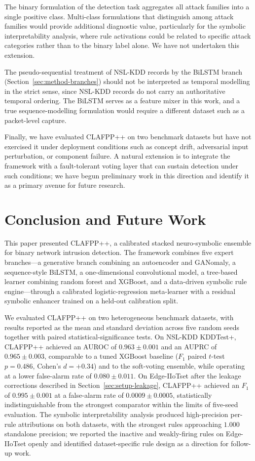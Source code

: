 \documentclass[pdflatex,sn-mathphys-num]{sn-jnl}
\theoremstyle{thmstyleone}
\theoremstyle{thmstyletwo}
\theoremstyle{thmstylethree}
\begin{document}
The binary formulation of the detection task aggregates all attack families into a single positive class. Multi-class formulations that distinguish among attack families would provide additional diagnostic value, particularly for the symbolic interpretability analysis, where rule activations could be related to specific attack categories rather than to the binary label alone. We have not undertaken this extension.

The pseudo-sequential treatment of NSL-KDD records by the BiLSTM branch (Section~\ref{sec:method-branches}) should not be interpreted as temporal modelling in the strict sense, since NSL-KDD records do not carry an authoritative temporal ordering. The BiLSTM serves as a feature mixer in this work, and a true sequence-modelling formulation would require a different dataset such as a packet-level capture.

Finally, we have evaluated CLAFPP++ on two benchmark datasets but have not exercised it under deployment conditions such as concept drift, adversarial input perturbation, or component failure. A natural extension is to integrate the framework with a fault-tolerant voting layer that can sustain detection under such conditions; we have begun preliminary work in this direction and identify it as a primary avenue for future research.

\section{Conclusion and Future Work}\label{sec:conclusion}

This paper presented CLAFPP++, a calibrated stacked neuro-symbolic ensemble for binary network intrusion detection. The framework combines five expert branches---a generative branch combining an autoencoder and GANomaly, a sequence-style BiLSTM, a one-dimensional convolutional model, a tree-based learner combining random forest and XGBoost, and a data-driven symbolic rule engine---through a calibrated logistic-regression meta-learner with a residual symbolic enhancer trained on a held-out calibration split.

We evaluated CLAFPP++ on two heterogeneous benchmark datasets, with results reported as the mean and standard deviation across five random seeds together with paired statistical-significance tests. On NSL-KDD KDDTest+, CLAFPP++ achieved an AUROC of $0.963 \pm 0.001$ and an AUPRC of $0.965 \pm 0.003$, comparable to a tuned XGBoost baseline ($F_1$ paired $t$-test $p = 0.486$, Cohen's $d = +0.34$) and to the soft-voting ensemble, while operating at a lower false-alarm rate of $0.080 \pm 0.011$. On Edge-IIoTset after the leakage corrections described in Section~\ref{sec:setup-leakage}, CLAFPP++ achieved an $F_1$ of $0.995 \pm 0.001$ at a false-alarm rate of $0.0009 \pm 0.0005$, statistically indistinguishable from the strongest comparator within the limits of five-seed evaluation. The symbolic interpretability analysis produced high-precision per-rule attributions on both datasets, with the strongest rules approaching $1.000$ standalone precision; we reported the inactive and weakly-firing rules on Edge-IIoTset openly and identified dataset-specific rule design as a direction for follow-up work.
\end{document}
